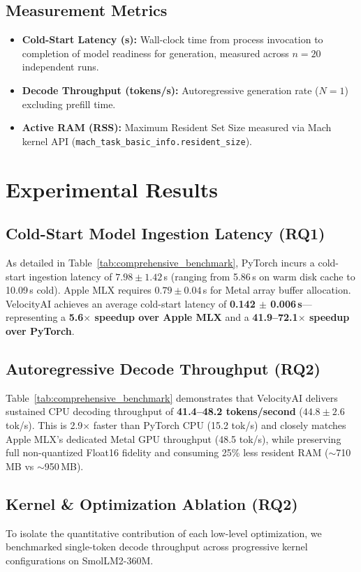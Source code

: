 \documentclass[10pt,twocolumn]{article}
\begin{document}
\subsection{Measurement Metrics}
\begin{itemize}
    \item \textbf{Cold-Start Latency (s):} Wall-clock time from process invocation to completion of model readiness for generation, measured across $n=20$ independent runs.
    \item \textbf{Decode Throughput (tokens/s):} Autoregressive generation rate ($N=1$) excluding prefill time.
    \item \textbf{Active RAM (RSS):} Maximum Resident Set Size measured via Mach kernel API (\texttt{mach\_task\_basic\_info.resident\_size}).
\end{itemize}

\section{Experimental Results}

\subsection{Cold-Start Model Ingestion Latency (RQ1)}
As detailed in Table~\ref{tab:comprehensive_benchmark}, PyTorch incurs a cold-start ingestion latency of $7.98 \pm 1.42$\,s (ranging from 5.86\,s on warm disk cache to 10.09\,s cold). Apple MLX requires $0.79 \pm 0.04$\,s for Metal array buffer allocation. VelocityAI achieves an average cold-start latency of \textbf{0.142 $\pm$ 0.006\,s}---representing a \textbf{5.6$\times$ speedup over Apple MLX} and a \textbf{41.9--72.1$\times$ speedup over PyTorch}.

\subsection{Autoregressive Decode Throughput (RQ2)}
Table~\ref{tab:comprehensive_benchmark} demonstrates that VelocityAI delivers sustained CPU decoding throughput of \textbf{41.4--48.2 tokens/second} ($44.8 \pm 2.6$ tok/s). This is 2.9$\times$ faster than PyTorch CPU (15.2 tok/s) and closely matches Apple MLX's dedicated Metal GPU throughput (48.5 tok/s), while preserving full non-quantized Float16 fidelity and consuming 25\% less resident RAM ($\sim$710\,MB vs $\sim$950\,MB).

\subsection{Kernel \& Optimization Ablation (RQ2)}
To isolate the quantitative contribution of each low-level optimization, we benchmarked single-token decode throughput across progressive kernel configurations on SmolLM2-360M.
\end{document}
